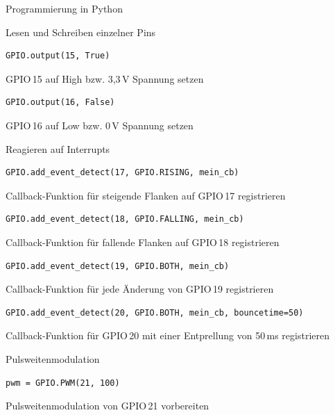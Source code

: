 {\begin{frame}{Programmierung in Python}
\begin{block}{Lesen und Schreiben einzelner Pins}
        \begin{lstlisting}[style=MethodenListe, gobble=12]
            GPIO.output(15, True)
        \end{lstlisting}
        GPIO\,15 auf High bzw. 3,3\,V Spannung setzen
        \medskip

        \begin{lstlisting}[style=MethodenListe, gobble=12]
            GPIO.output(16, False)
        \end{lstlisting}
        GPIO\,16 auf Low bzw. 0\,V Spannung setzen
        \medskip
    \end{block}

    \begin{block}{Reagieren auf Interrupts}
        \begin{lstlisting}[style=MethodenListe, gobble=12]
            GPIO.add_event_detect(17, GPIO.RISING, mein_cb)
        \end{lstlisting}
        Callback-Funktion für steigende Flanken auf GPIO\,17 registrieren
        \medskip

        \begin{lstlisting}[style=MethodenListe, gobble=12]
            GPIO.add_event_detect(18, GPIO.FALLING, mein_cb)
        \end{lstlisting}
        Callback-Funktion für fallende Flanken auf GPIO\,18 registrieren
        \medskip
    \end{block}

    \framebreak

    {
        \begin{lstlisting}[style=MethodenListe, gobble=12]
            GPIO.add_event_detect(19, GPIO.BOTH, mein_cb)
        \end{lstlisting}
        Callback-Funktion für jede Änderung von GPIO\,19 registrieren
        \medskip

        \begin{lstlisting}[style=MethodenListe, gobble=12]
            GPIO.add_event_detect(20, GPIO.BOTH, mein_cb, bouncetime=50)
        \end{lstlisting}
        Callback-Funktion für GPIO\,20 mit einer Entprellung von 50\,ms registrieren
        \medskip
    }

    \begin{block}{Pulsweitenmodulation}
        \begin{lstlisting}[style=MethodenListe, gobble=12]
            pwm = GPIO.PWM(21, 100)
        \end{lstlisting}
        Pulsweitenmodulation von GPIO\,21 vorbereiten
        \medskip


\end{block}
\end{frame}}
